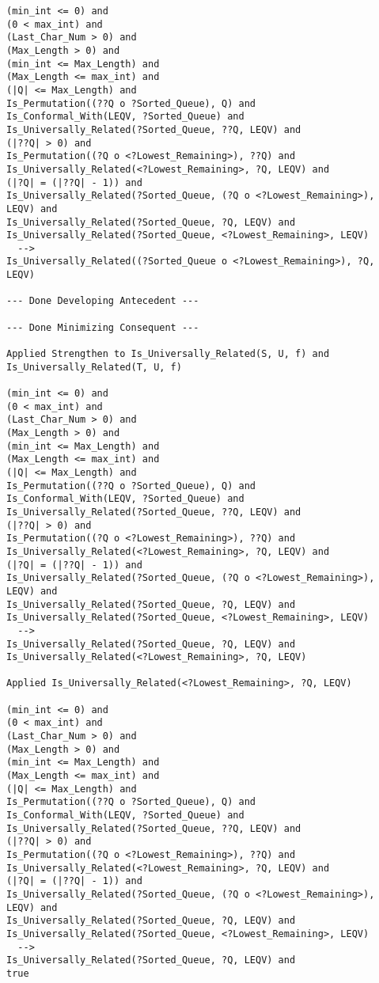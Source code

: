 \begin{lstlisting}[language=resolve]
(min_int <= 0) and
(0 < max_int) and
(Last_Char_Num > 0) and
(Max_Length > 0) and
(min_int <= Max_Length) and
(Max_Length <= max_int) and
(|Q| <= Max_Length) and
Is_Permutation((??Q o ?Sorted_Queue), Q) and
Is_Conformal_With(LEQV, ?Sorted_Queue) and
Is_Universally_Related(?Sorted_Queue, ??Q, LEQV) and
(|??Q| > 0) and
Is_Permutation((?Q o <?Lowest_Remaining>), ??Q) and
Is_Universally_Related(<?Lowest_Remaining>, ?Q, LEQV) and
(|?Q| = (|??Q| - 1)) and
Is_Universally_Related(?Sorted_Queue, (?Q o <?Lowest_Remaining>), LEQV) and
Is_Universally_Related(?Sorted_Queue, ?Q, LEQV) and
Is_Universally_Related(?Sorted_Queue, <?Lowest_Remaining>, LEQV)
  -->
Is_Universally_Related((?Sorted_Queue o <?Lowest_Remaining>), ?Q, LEQV)

--- Done Developing Antecedent ---

--- Done Minimizing Consequent ---

Applied Strengthen to Is_Universally_Related(S, U, f) and Is_Universally_Related(T, U, f)

(min_int <= 0) and
(0 < max_int) and
(Last_Char_Num > 0) and
(Max_Length > 0) and
(min_int <= Max_Length) and
(Max_Length <= max_int) and
(|Q| <= Max_Length) and
Is_Permutation((??Q o ?Sorted_Queue), Q) and
Is_Conformal_With(LEQV, ?Sorted_Queue) and
Is_Universally_Related(?Sorted_Queue, ??Q, LEQV) and
(|??Q| > 0) and
Is_Permutation((?Q o <?Lowest_Remaining>), ??Q) and
Is_Universally_Related(<?Lowest_Remaining>, ?Q, LEQV) and
(|?Q| = (|??Q| - 1)) and
Is_Universally_Related(?Sorted_Queue, (?Q o <?Lowest_Remaining>), LEQV) and
Is_Universally_Related(?Sorted_Queue, ?Q, LEQV) and
Is_Universally_Related(?Sorted_Queue, <?Lowest_Remaining>, LEQV)
  -->
Is_Universally_Related(?Sorted_Queue, ?Q, LEQV) and
Is_Universally_Related(<?Lowest_Remaining>, ?Q, LEQV)

Applied Is_Universally_Related(<?Lowest_Remaining>, ?Q, LEQV)

(min_int <= 0) and
(0 < max_int) and
(Last_Char_Num > 0) and
(Max_Length > 0) and
(min_int <= Max_Length) and
(Max_Length <= max_int) and
(|Q| <= Max_Length) and
Is_Permutation((??Q o ?Sorted_Queue), Q) and
Is_Conformal_With(LEQV, ?Sorted_Queue) and
Is_Universally_Related(?Sorted_Queue, ??Q, LEQV) and
(|??Q| > 0) and
Is_Permutation((?Q o <?Lowest_Remaining>), ??Q) and
Is_Universally_Related(<?Lowest_Remaining>, ?Q, LEQV) and
(|?Q| = (|??Q| - 1)) and
Is_Universally_Related(?Sorted_Queue, (?Q o <?Lowest_Remaining>), LEQV) and
Is_Universally_Related(?Sorted_Queue, ?Q, LEQV) and
Is_Universally_Related(?Sorted_Queue, <?Lowest_Remaining>, LEQV)
  -->
Is_Universally_Related(?Sorted_Queue, ?Q, LEQV) and
true


\end{lstlisting}
